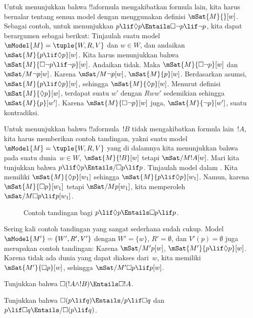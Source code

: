 \documentclass[../../../include/open-logic-section]{subfiles}
\begin{document}
\begin{ex}
  Untuk menunjukkan bahwa !!a{formula} mengakibatkan formula lain, kita harus
  bernalar tentang semua model dengan menggunakan definisi
  $\mSat{M}{}[w]$. Sebagai contoh, untuk menunjukkan
  $p \lif \Diamond p \Entails \Box\lnot p \lif \lnot p$, kita dapat
  berargumen sebagai berikut: Tinjaulah suatu model
  $\mModel{M} = \tuple{W, R, V}$ dan $w \in W$, dan andaikan
  $\mSat{M}{p \lif \Diamond p}[w]$. Kita harus menunjukkan bahwa
  $\mSat{M}{\Box\lnot p \lif \lnot p}[w]$. Andaikan tidak. Maka
  $\mSat{M}{\Box\lnot p}[w]$ dan $\mSat/{M}{\lnot p}[w]$. Karena
  $\mSat/{M}{\lnot p}[w]$, $\mSat{M}{p}[w]$. Berdasarkan asumsi,
  $\mSat{M}{p \lif \Diamond p}[w]$, sehingga
  $\mSat{M}{\Diamond p}[w]$. Menurut definisi
  $\mSat{M}{\Diamond p}[w]$, terdapat suatu $w'$ dengan $Rww'$ sedemikian
  sehingga $\mSat{M}{p}[w']$. Karena $\mSat{M}{\Box \lnot p}[w]$ juga,
  $\mSat{M}{\lnot p}[w']$, suatu kontradiksi.

  Untuk menunjukkan bahwa !!a{formula}~$!B$ tidak mengakibatkan formula
  lain~$!A$, kita harus memberikan contoh tandingan, yakni suatu model
  $\mModel{M} = \tuple{W, R, V}$ yang di dalamnya kita menunjukkan bahwa pada
  suatu dunia~$w \in W$, $\mSat{M}{!B}[w]$ tetapi
  $\mSat/{M}{!A}[w]$. Mari kita tunjukkan bahwa
  $p \lif \Diamond p \Entails/ \Box p \lif p$. Tinjaulah model dalam
  . Kita memiliki $\mSat{M}{\Diamond p}[w_1]$ sehingga
  $\mSat{M}{p \lif \Diamond p}[w_1]$. Namun, karena
  $\mSat{M}{\Box p}[w_1]$ tetapi $\mSat/{M}{p}[w_1]$, kita memperoleh
  $\mSat/{M}{\Box p \lif p}[w_1]$.
  \begin{figure}
  \begin{center}
  \end{center}
  \caption{Contoh tandingan bagi $p \lif \Diamond p
  \Entails \Box p \lif p$.}
  \end{figure}
  
  Sering kali contoh tandingan yang sangat sederhana sudah cukup. Model
  $\mModel{M'} = \{W', R', V'\}$ dengan $W' = \{w\}$,
  $R' = \emptyset$, dan $V'(p) = \emptyset$ juga merupakan contoh tandingan:
  Karena $\mSat/{M'}{p}[w]$, $\mSat{M'}{p \lif \Diamond p}[w]$. Karena tidak
  ada dunia yang dapat diakses dari~$w$, kita memiliki
  $\mSat{M'}{\Box p}[w]$, sehingga $\mSat/{M'}{\Box p \lif p}[w]$.
\end{ex}

\begin{prob}
  Tunjukkan bahwa $\Box (!A \land !B) \Entails \Box !A$.
\end{prob}

\begin{prob}
  Tunjukkan bahwa $\Box (p \lif q) \Entails/ p \lif \Box q$ dan
  $p \lif \Box q \Entails/\Box (p \lif q)$.
\end{prob}
\end{document}
